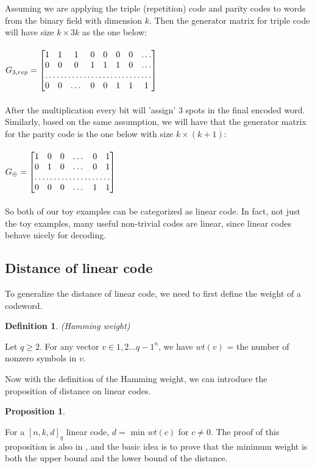 \documentclass{article}
\newtheorem{Definition}{Definition}
\newtheorem{Proposition}{Proposition}
\begin{document}
Assuming we are applying the triple (repetition) code and parity codes to words from the binary field with dimension $k$. Then the generator matrix for triple code will have size $k \times 3k$ as the one below:\\\\
$G_{3,rep} = \begin{bmatrix}
    1 & 1 & 1 & 0 & 0 & 0 & 0 & \dots\\
    0 & 0 & 0 & 1 & 1 & 1 & 0 & \dots \\
    \hdotsfor{8} \\
    0 & 0 & \dots & 0 & 0 & 1 & 1 & 1 \\
\end{bmatrix}$\\\\ 
After the multiplication every bit will 'assign' 3 spots in the final encoded word. Similarly, based on the same assumption, we will have that the generator matrix for the parity code is the one below with size $k \times (k+1) $:\\\\
$G_\oplus = \begin{bmatrix}
    1 & 0& 0 & \dots & 0 & 1\\
    0 & 1& 0 & \dots & 0 & 1 \\
    \hdotsfor{6} \\
    0 & 0& 0 & \dots & 1 & 1 \\
\end{bmatrix}$\\\\
So both of our toy examples can be categorized as linear code. In fact, not just the toy examples, many useful non-trivial codes are linear, since linear codes behave nicely for decoding.
\subsection{Distance of linear code}
To generalize the distance of linear code, we need to first define the weight of a codeword.
\begin{Definition}(Hamming weight)\end{Definition}
\noindent Let $q \ge 2$. For any vector $v \in {1,2...q-1}^n$, we have $wt(v)$ = the number of nonzero symbols in $v$.

Now with the definition of the Hamming weight, we can introduce the proposition of distance on linear codes.
\begin{Proposition} \end{Proposition}
\noindent For a $[n,k,d]_q$ linear code, $d =$ min $wt(c)$ for $c \neq 0$. The proof of this proposition is also in \cite{book}, and the basic idea is to prove that the minimum weight is both the upper bound and the lower bound of the distance.
\end{document}
